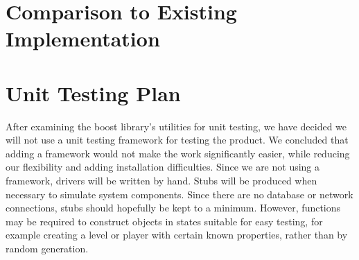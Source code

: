 \documentclass[12pt, titlepage]{article}
\begin{document}
\newpage
\section{Comparison to Existing Implementation}	
\label{section5}
	
\newpage
\section{Unit Testing Plan}
\label{section6}
	
	After examining the boost library's utilities for unit testing, we have decided we will not use a unit testing framework for testing the product. We concluded that adding a framework would not make the work significantly easier, while reducing our flexibility and adding installation difficulties. Since we are not using a framework, drivers will be written by hand. Stubs will be produced when necessary to simulate system components. Since there are no database or network connections, stubs should hopefully be kept to a minimum. However, functions may be required to construct objects in states suitable for easy testing, for example creating a level or player with certain known properties, rather than by random generation.
	
\end{document}
